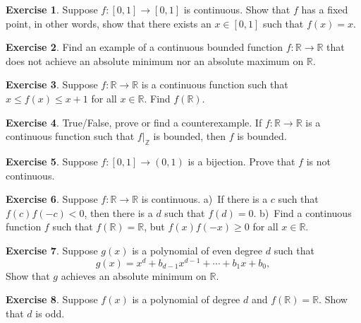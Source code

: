 \documentclass[12pt]{book}
\newcommand{\R}{{\mathbb{R}}}
\newcommand{\Z}{{\mathbb{Z}}}
\theoremstyle{plain}
\theoremstyle{remark}
\theoremstyle{definition}
\theoremstyle{exercise}
\newtheorem{exercise}{Exercise}[section]
\theoremstyle{example}
\begin{document}
\begin{exercise}
Suppose $f \colon [0,1] \to [0,1]$ is continuous.  Show that $f$
has a fixed point, in other words, show that there exists an $x \in [0,1]$ such that
$f(x) = x$.
\end{exercise}

\begin{exercise}
Find an example of a continuous bounded function $f \colon \R \to \R$ that does
not achieve an absolute minimum nor an absolute maximum on $\R$.
\end{exercise}

\begin{exercise}
Suppose $f \colon \R \to \R$ is a continuous function such that
$x \leq f(x) \leq x+1$ for all $x \in \R$.  Find $f(\R)$.
\end{exercise}

\begin{exercise}
True/False, prove or find a counterexample.  If $f \colon \R \to
\R$ is a continuous function such that $f|_{\Z}$ is bounded, then $f$
is bounded.
\end{exercise}

\begin{exercise}
Suppose $f \colon [0,1] \to (0,1)$ is a bijection.  Prove that $f$ is not
continuous.
\end{exercise}

\begin{exercise}
Suppose $f \colon \R \to \R$ is continuous.
a)~If there is a $c$ such that $f(c)f(-c) < 0$,
then there is a $d$ such that $f(d) = 0$.
b)~Find a continuous function $f$ such that
$f(\R) = \R$, but $f(x)f(-x) \geq 0$ for all $x \in \R$.
\end{exercise}

\begin{exercise}
Suppose $g(x)$ is a polynomial of even degree $d$ such that
\begin{equation*}
g(x) = x^d + b_{d-1} x^{d-1} + \cdots + b_1 x + b_0 ,
\end{equation*}
Show that $g$ achieves an absolute minimum on $\R$.
\end{exercise}

\begin{exercise}
Suppose $f(x)$ is a polynomial of degree $d$ and 
$f(\R) = \R$.  Show that $d$ is odd.
\end{exercise}

\end{document}
